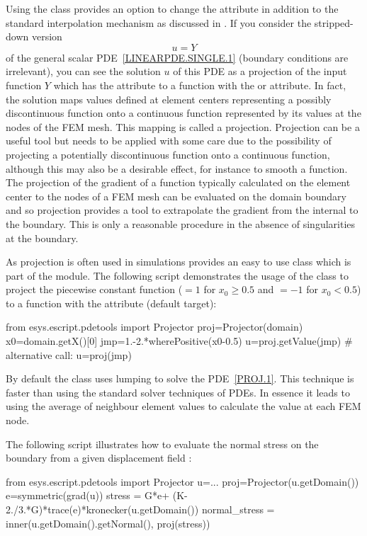 Using the \LinearPDE class provides an option to change the \FunctionSpace
attribute in addition to the standard interpolation mechanism
as discussed in . If you consider the stripped-down version 
\begin{equation}\label{PROJ.1}
u = Y
\end{equation}
of the general scalar PDE~\ref{LINEARPDE.SINGLE.1} (boundary conditions are
irrelevant), you can see the solution $u$ of this PDE as a projection of the
input function $Y$ which has the \Function attribute to a function with the
\SolutionFS or \ReducedSolutionFS attribute.
In fact, the solution maps values defined at element centers representing a
possibly discontinuous function onto a continuous function represented by its
values at the nodes of the FEM mesh.
This mapping is called a projection. Projection can be a
useful tool but needs to be applied with some care due to the possibility of
projecting a potentially discontinuous function onto a continuous function,
although this may also be a desirable effect, for instance to smooth a function.
The projection of the gradient of a function typically calculated on the
element center to the nodes of a FEM mesh can be evaluated on the domain
boundary and so projection provides a tool to extrapolate the gradient from
the internal to the boundary. This is only a reasonable procedure in the
absence of singularities at the boundary.

As projection is often used in simulations \escript provides an easy to use
class  which is part of the \pdetools module.
The following script demonstrates the usage of the class to project the
piecewise constant function ($=1$ for $x_{0}\ge 0.5$ and $=-1$ for $x_{0}<0.5$)
to a function with the \ReducedSolutionFS attribute (default target):
\begin{python}
  from esys.escript.pdetools import Projector
  proj=Projector(domain)
  x0=domain.getX()[0]
  jmp=1.-2.*wherePositive(x0-0.5)
  u=proj.getValue(jmp)
  # alternative call:
  u=proj(jmp)
\end{python}
By default the class uses lumping to solve the PDE~\ref{PROJ.1}.
This technique is faster than using the standard solver techniques of PDEs.
In essence it leads to using the average of neighbour element values to
calculate the value at each FEM node. 

The following script illustrates how to evaluate the normal stress on the
boundary from a given displacement field :
\begin{python}
  from esys.escript.pdetools import Projector
  u=...
  proj=Projector(u.getDomain())
  e=symmetric(grad(u))
  stress = G*e+ (K-2./3.*G)*trace(e)*kronecker(u.getDomain())
  normal_stress = inner(u.getDomain().getNormal(), proj(stress))
\end{python}

